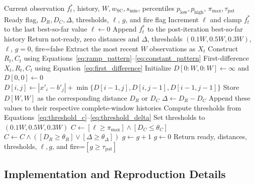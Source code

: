 \documentclass[journal,article,submit,moreauthors]{Definitions/mdpi}
\begin{document}
\begin{algorithm}[p]
\caption{Monitor update: derivatives, thresholds, and temporal confirmation.}
\label{alg:monitor}
\footnotesize
\begin{algorithmic}[1]
\Require Current observation $f_t^*$, history, $W,w_{\mathrm{SC}},s_{\min}$,
percentiles $p_{\mathrm{low}},p_{\mathrm{high}}$, $\pi_{\max},\tau_{\mathrm{pat}}$
\Ensure Ready flag, $D_R,D_C,\Delta$, thresholds, $\ell$, $g$, and fire flag
  \State Increment $\ell$ and clamp $f_t^*$ to the last best-so-far value
\Else
  \State $\ell\gets0$
\EndIf
\State Append $f_t^*$ to the post-iteration best-so-far history
  \State Return not-ready, zero distances and $\Delta$, thresholds
  $(0.1W,0.5W,0.3W)$, $\ell$, $g=0$, fire=false
\EndIf
\State Extract the most recent $W$ observations as $X_t$
\State Construct $R_t,C_t$ using Equations~\ref{eq:ramp_pattern}--\ref{eq:constant_pattern}
\State First-difference $X_t,R_t,C_t$ using Equation~\ref{eq:first_difference}
  \State Initialize $D[0{:}W,0{:}W]\gets\infty$ and $D[0,0]\gets0$
      \State $D[i,j]\gets|x'_i-b'_j|+\min\{D[i-1,j],D[i,j-1],D[i-1,j-1]\}$
    \EndFor
  \EndFor
  \State Store $D[W,W]$ as the corresponding distance $D_R$ or $D_C$
\EndFor
\State $\Delta\gets D_R-D_C$
\State Append these values to their respective complete-window histories
  \State Compute thresholds from Equations~\ref{eq:threshold_c}--\ref{eq:threshold_delta}
\Else
  \State Set thresholds to $(0.1W,0.5W,0.3W)$
\EndIf
\State $C\gets[\ell\geq\pi_{\max}]\land[D_C\leq\theta_C]$
\State $C\gets C\land([D_R\geq\theta_R]\lor[\Delta\geq\theta_\Delta])$
  \State $g\gets g+1$
\Else
  \State $g\gets0$
\EndIf
\State Return ready, distances, thresholds, $\ell,g$, and fire=$[g\geq\tau_{\mathrm{pat}}]$
\end{algorithmic}
\end{algorithm}

\subsection{Implementation and Reproduction Details}
\label{subsec:reproduction}
\end{document}
